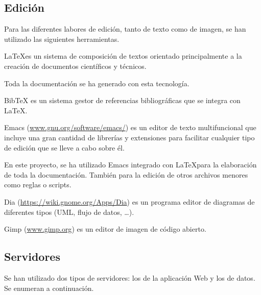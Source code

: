 \subsection{Edición}

Para las diferentes labores de edición, tanto de texto como de imagen, se han
utilizado las siguientes herramientas. 

\begin{definitionlist} 
\item[\LaTeX]

  \LaTeX es un sistema de composición de textos orientado principalmente a la
  creación de documentos científicos y técnicos. 

  Toda la documentación se ha generado con esta tecnología. 

\item[BibTeX]
  BibTeX es un sistema gestor de referencias bibliográficas que se integra con
\LaTeX.

\item[Emacs]

  Emacs (\url{www.gnu.org/software/emacs/}) es un editor de texto multifuncional
  que incluye una gran cantidad de librerías y extensiones para facilitar
  cualquier tipo de edición que se lleve a cabo sobre él. 

  En este proyecto, se ha utilizado Emacs integrado con \LaTeX para la
  elaboración de toda la documentación. También para la edición de otros archivos
  menores como reglas o scripts. 

\item[Dia]

  Dia (\url{https://wiki.gnome.org/Apps/Dia}) es un programa editor de diagramas
  de diferentes tipos (\acs{UML}, flujo de datos, \ldots). 

\item[Gimp]

  
  Gimp (\url{www.gimp.org}) es un editor de imagen de código abierto. 

\end{definitionlist}

\subsection{Servidores}

Se han utilizado dos tipos de servidores: los de la aplicación Web y los de
datos. Se enumeran a continuación. 

